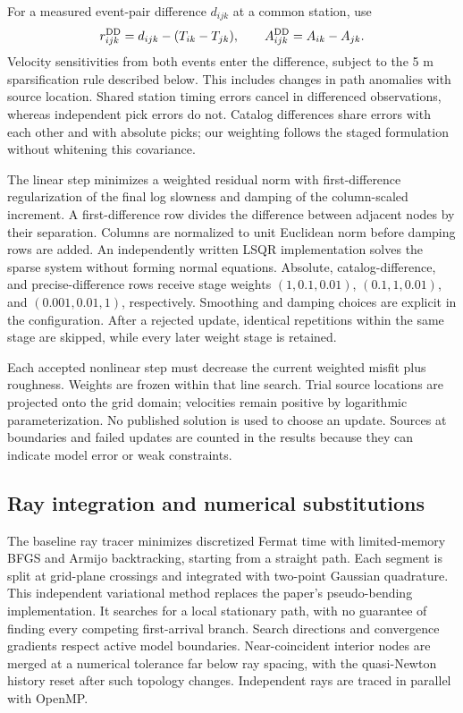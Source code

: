 \documentclass[11pt]{article}
\begin{document}
For a measured event-pair difference $d_{ijk}$ at a common station, use
\begin{equation}
 r_{ijk}^{\rm DD}=d_{ijk}-(T_{ik}-T_{jk}),\qquad
 A_{ijk}^{\rm DD}=A_{ik}-A_{jk}.
\end{equation}
Velocity sensitivities from both events enter the difference, subject to
the 5 m sparsification rule described below. This includes changes in path
anomalies with source location. Shared station timing
errors cancel in differenced observations, whereas independent pick errors
do not. Catalog differences share errors with each other and with absolute
picks; our weighting follows the staged formulation without whitening this
covariance.

The linear step minimizes a weighted residual norm with first-difference
regularization of the final log slowness and damping of the column-scaled
increment. A first-difference row divides the difference between adjacent
nodes by their separation. Columns are normalized to unit Euclidean norm
before damping rows are added. An independently written LSQR implementation
solves the sparse system without forming normal equations. Absolute,
catalog-difference, and precise-difference rows receive stage weights
$(1,0.1,0.01)$, $(0.1,1,0.01)$, and $(0.001,0.01,1)$, respectively.
Smoothing and damping choices are explicit in the configuration. After a rejected update, identical repetitions within the same stage are skipped, while every later weight stage is retained.

Each accepted nonlinear step must decrease the current weighted misfit plus
roughness. Weights are frozen within that line search. Trial source locations
are projected onto the grid domain; velocities remain positive by logarithmic
parameterization. No published solution is used to choose an update. Sources
at boundaries and failed updates are counted in the results because they
can indicate model error or weak constraints.

\subsection{Ray integration and numerical substitutions}
The baseline ray tracer minimizes discretized Fermat time with limited-memory BFGS
and Armijo backtracking, starting from a straight path. Each segment is split
at grid-plane crossings and integrated with two-point Gaussian quadrature.
This independent variational method replaces the paper's pseudo-bending
implementation. It searches for a local stationary path, with no guarantee
of finding every competing first-arrival branch. Search directions and
convergence gradients respect active model boundaries. Near-coincident
interior nodes are merged at a numerical tolerance far below ray spacing,
with the quasi-Newton history reset after such topology changes. Independent rays are traced
in parallel with OpenMP.
\end{document}
